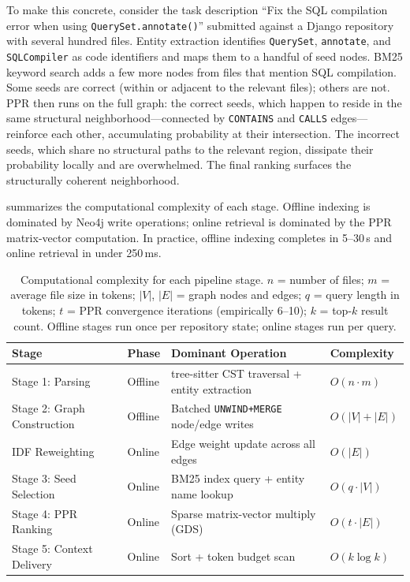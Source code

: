 To make this concrete, consider the task description ``Fix the SQL compilation error when using \texttt{QuerySet.annotate()}'' submitted against a Django repository with several hundred files. Entity extraction identifies \texttt{QuerySet}, \texttt{annotate}, and \texttt{SQLCompiler} as code identifiers and maps them to a handful of seed nodes. BM25 keyword search adds a few more nodes from files that mention SQL compilation. Some seeds are correct (within or adjacent to the relevant files); others are not. PPR then runs on the full graph: the correct seeds, which happen to reside in the same structural neighborhood---connected by \texttt{CONTAINS} and \texttt{CALLS} edges---reinforce each other, accumulating probability at their intersection. The incorrect seeds, which share no structural paths to the relevant region, dissipate their probability locally and are overwhelmed. The final ranking surfaces the structurally coherent neighborhood.

 summarizes the computational complexity of each stage. Offline indexing is dominated by Neo4j write operations; online retrieval is dominated by the PPR matrix-vector computation. In practice, offline indexing completes in 5--30\,s and online retrieval in under 250\,ms.

\begin{table}[H]
    \centering
    \caption[Per-stage computational complexity]{Computational complexity for each pipeline stage. $n$ = number of files; $m$ = average file size in tokens; $|V|$, $|E|$ = graph nodes and edges; $q$ = query length in tokens; $t$ = PPR convergence iterations (empirically 6--10); $k$ = top-$k$ result count. Offline stages run once per repository state; online stages run per query.}
    \label{tab:stage-complexity}
    \begin{tabularx}{\textwidth}{l l X l}
        \toprule
        \textbf{Stage} & \textbf{Phase} & \textbf{Dominant Operation} & \textbf{Complexity} \\
        \midrule
        Stage 1: Parsing          & Offline & tree-sitter CST traversal + entity extraction & $O(n \cdot m)$ \\
        \addlinespace[3pt]
        Stage 2: Graph Construction & Offline & Batched \texttt{UNWIND+MERGE} node/edge writes & $O(|V| + |E|)$ \\
        \addlinespace[3pt]
        IDF Reweighting           & Online  & Edge weight update across all edges & $O(|E|)$ \\
        \addlinespace[3pt]
        Stage 3: Seed Selection   & Online  & BM25 index query + entity name lookup & $O(q \cdot |V|)$ \\
        \addlinespace[3pt]
        Stage 4: PPR Ranking      & Online  & Sparse matrix-vector multiply (GDS) & $O(t \cdot |E|)$ \\
        \addlinespace[3pt]
        Stage 5: Context Delivery & Online  & Sort + token budget scan & $O(k \log k)$ \\
        \bottomrule
    \end{tabularx}
\end{table}

